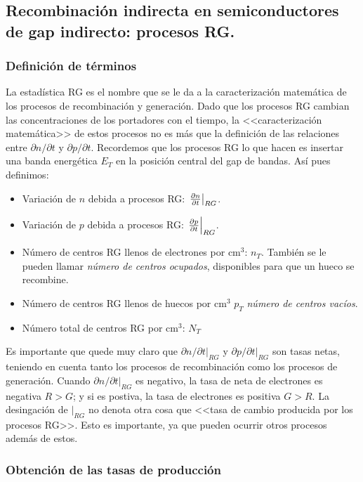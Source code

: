 \subsection{Recombinación indirecta en semiconductores de gap indirecto: procesos RG.}

\subsubsection{Definición de términos}

La estadística RG es el nombre que se le da a la caracterización matemática de los procesos de recombinación y generación. Dado que los procesos RG cambian las concentraciones de los portadores con el tiempo, la <<caracterización matemática>> de estos procesos no es más que la definición de las relaciones entre $\partial n / \partial t$ y $\partial p / \partial t$. Recordemos que los procesos RG lo que hacen es insertar una banda energética $E_T$ en la posición central del gap de bandas. Así pues definimos:

\begin{itemize}
	\item Variación de $n$ debida a procesos RG: $\eval{\parciales{n}{t}}_{RG}$.
	\item Variación de $p$ debida a procesos RG: $\eval{\parciales{p}{t}}_{RG}$.
	\item Número de centros RG llenos de electrones por $\mathrm{cm}^3$: $n_T$. También se le pueden llamar \textit{número de centros ocupados}, disponibles para que un hueco se recombine.
	\item Número de centros RG llenos de huecos por $\mathrm{cm}^3$ $p_T$ \textit{número de centros vacíos}.
	\item Número total de centros RG por $\mathrm{cm}^3$: $N_T$
\end{itemize}
Es importante que quede muy claro que $\partial n / \partial t |_{RG}$ y $\partial p / \partial t|_{RG} $ son tasas netas, teniendo en cuenta tanto los procesos de recombinación como los procesos de generación. Cuando $\partial n / \partial t|_{RG}$ es negativo, la tasa de neta de electrones es negativa $R>G$; y si es postiva, la tasa de electrones es positiva $G>R$. La desingación de $|_{RG}$ no denota otra cosa que <<tasa de cambio producida por los procesos RG>>. Esto es importante, ya que pueden ocurrir otros procesos además de estos.

\subsubsection{Obtención de las tasas de producción}

